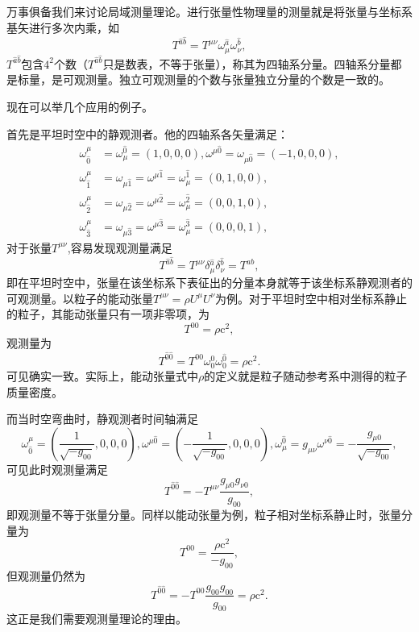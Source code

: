 \documentclass[11pt, a4paper, oneside, onecolumn]{ctexart}
\numberwithin{equation}{subsection}
\begin{document}
万事俱备我们来讨论局域测量理论。进行张量性物理量的测量就是将张量与坐标系基矢进行多次内乘，如
\begin{equation}
T^{\hat{a}\hat{b}}=T^{\mu\nu}\omega_{\mu}^{\hat{a}}\omega_{\nu}^{\hat{b}},
\end{equation}
$T^{\hat{a}\hat{b}}$包含$4^{2}$个数（$T^{\hat{a}\hat{b}}$只是数表，不等于张量），称其为四轴系分量。四轴系分量都是标量，是可观测量。独立可观测量的个数与张量独立分量的个数是一致的。

现在可以举几个应用的例子。

首先是平坦时空中的静观测者。他的四轴系各矢量满足：
\begin{align}
\omega_{\hat{0}}^{\mu}&=\omega_{\mu}^{\hat{0}}=\left(1,0,0,0\right),\omega^{\mu\hat{0}}=\omega_{\mu\hat{0}}=\left(-1,0,0,0\right),\label{2.3.22}\\
\omega_{\hat{1}}^{\mu}&=\omega_{\mu\hat{1}}=\omega^{\mu\hat{1}}=\omega_{\mu}^{\hat{1}}=\left(0,1,0,0\right),\\
\omega_{\hat{2}}^{\mu}&=\omega_{\mu\hat{2}}=\omega^{\mu\hat{2}}=\omega_{\mu}^{\hat{2}}=\left(0,0,1,0\right),\\
\omega_{\hat{3}}^{\mu}&=\omega_{\mu\hat{3}}=\omega^{\mu\hat{3}}=\omega_{\mu}^{\hat{3}}=\left(0,0,0,1\right),\label{2.3.25}
\end{align}
对于张量$T^{\mu\nu}$,容易发现观测量满足
\begin{equation}
T^{\hat{a}\hat{b}}=T^{\mu\nu}\delta{}^{\hat{a}}_{\mu}\delta{}^{\hat{b}}_{\nu}=T^{ab},
\end{equation}
即在平坦时空中，张量在该坐标系下表征出的分量本身就等于该坐标系静观测者的可观测量。以粒子的能动张量$T^{\mu\nu}=\rho U^{\mu}U^{\nu}$为例。对于平坦时空中相对坐标系静止的粒子，其能动张量只有一项非零项，为
\begin{equation}
T^{00}=\rho \mathrm{c}^{2},
\end{equation}
观测量为
\begin{equation}
T^{\hat{0}\hat{0}}=T^{00}\omega_{0}^{\hat{0}}\omega_{0}^{\hat{0}}=\rho \mathrm{c}^{2}.
\end{equation}
可见确实一致。实际上，能动张量式中$\rho$的定义就是粒子随动参考系中测得的粒子质量密度。

而当时空弯曲时，静观测者时间轴满足
\begin{equation}
\omega^{\mu}_{\hat{0}}=\left(\frac{1}{\sqrt{-g_{00}}},0,0,0\right),\omega^{\mu\hat{0}}=\left(-\frac{1}{\sqrt{-g_{00}}},0,0,0\right),\omega_{\mu}^{\hat{0}}=g_{\mu\nu}\omega^{\nu\hat{0}}=-\frac{g_{\mu0}}{\sqrt{-g_{00}}},
\end{equation}
可见此时观测量满足
\begin{equation}
T^{\hat{0}\hat{0}}=-T^{\mu\nu}\frac{g_{\mu0}g_{\nu0}}{g_{00}},
\end{equation}
即观测量不等于张量分量。同样以能动张量为例，粒子相对坐标系静止时，张量分量为
\begin{equation}
T^{00}=\frac{\rho \mathrm{c}^{2}}{-g_{00}},
\end{equation}
但观测量仍然为
\begin{equation}
T^{\hat{0}\hat{0}}=-T^{00}\frac{g_{00}g_{00}}{g_{00}}=\rho \mathrm{c}^{2}.
\end{equation}
这正是我们需要观测量理论的理由。
\end{document}
